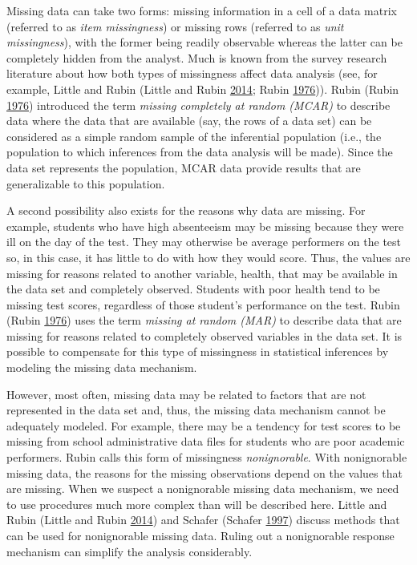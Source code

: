 \documentclass[]{krantz}
\begin{document}
Missing data can take two forms: missing information in a cell of a data
matrix (referred to as \emph{item missingness}) or missing rows
(referred to as \emph{unit missingness}), with the former being readily
observable whereas the latter can be completely hidden from the analyst.
Much is known from the survey research literature about how both types
of missingness affect data analysis (see, for example, Little and Rubin
(Little and Rubin \protect\hyperlink{ref-little2014statistical}{2014};
Rubin \protect\hyperlink{ref-rubin1976}{1976})). Rubin (Rubin
\protect\hyperlink{ref-rubin1976}{1976}) introduced the term
\emph{missing completely at random (MCAR)} to describe data where the
data that are available (say, the rows of a data set) can be considered
as a simple random sample of the inferential population (i.e., the
population to which inferences from the data analysis will be made).
Since the data set represents the population, MCAR data provide results
that are generalizable to this population.

A second possibility also exists for the reasons why data are missing.
For example, students who have high absenteeism may be missing because
they were ill on the day of the test. They may otherwise be average
performers on the test so, in this case, it has little to do with how
they would score. Thus, the values are missing for reasons related to
another variable, health, that may be available in the data set and
completely observed. Students with poor health tend to be missing test
scores, regardless of those student's performance on the test. Rubin
(Rubin \protect\hyperlink{ref-rubin1976}{1976}) uses the term
\emph{missing at random (MAR)} to describe data that are missing for
reasons related to completely observed variables in the data set. It is
possible to compensate for this type of missingness in statistical
inferences by modeling the missing data mechanism.

However, most often, missing data may be related to factors that are not
represented in the data set and, thus, the missing data mechanism cannot
be adequately modeled. For example, there may be a tendency for test
scores to be missing from school administrative data files for students
who are poor academic performers. Rubin calls this form of missingness
\emph{nonignorable}. With nonignorable missing data, the reasons for the
missing observations depend on the values that are missing. When we
suspect a nonignorable missing data mechanism, we need to use procedures
much more complex than will be described here. Little and Rubin (Little
and Rubin \protect\hyperlink{ref-little2014statistical}{2014}) and
Schafer (Schafer \protect\hyperlink{ref-schafer1997analysis}{1997})
discuss methods that can be used for nonignorable missing data. Ruling
out a nonignorable response mechanism can simplify the analysis
considerably.
\end{document}
